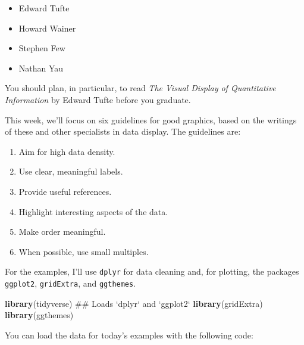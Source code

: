 \documentclass[]{book}
\makeatletter
\newenvironment{Shaded}{\begin{snugshade}}{\end{snugshade}}
\newcommand{\KeywordTok}[1]{\textcolor[rgb]{0.13,0.29,0.53}{\textbf{{#1}}}}
\newcommand{\DecValTok}[1]{\textcolor[rgb]{0.00,0.00,0.81}{{#1}}}
\newcommand{\StringTok}[1]{\textcolor[rgb]{0.31,0.60,0.02}{{#1}}}
\newcommand{\NormalTok}[1]{{#1}}
\providecommand{\tightlist}{%
  \setlength{\itemsep}{0pt}\setlength{\parskip}{0pt}}
\newenvironment{kframe}{%
\medskip{}
\setlength{\fboxsep}{.8em}
 \def\at@end@of@kframe{}%
 \ifinner\ifhmode%
  \def\at@end@of@kframe{\end{minipage}}%
  \begin{minipage}{\columnwidth}%
 \fi\fi%
 \def\FrameCommand##1{\hskip\@totalleftmargin \hskip-\fboxsep
 \colorbox{shadecolor}{##1}\hskip-\fboxsep
     \hskip-\linewidth \hskip-\@totalleftmargin \hskip\columnwidth}%
 \MakeFramed {\advance\hsize-\width
   \@totalleftmargin\z@ \linewidth\hsize
   \@setminipage}}%
 {\par\unskip\endMakeFramed%
 \at@end@of@kframe}
\renewenvironment{Shaded}{\begin{kframe}}{\end{kframe}}
\makeatother
\begin{document}
\begin{itemize}
\tightlist
\item
  Edward Tufte
\item
  Howard Wainer
\item
  Stephen Few
\item
  Nathan Yau
\end{itemize}

You should plan, in particular, to read \emph{The Visual Display of
Quantitative Information} by Edward Tufte before you graduate.

This week, we'll focus on six guidelines for good graphics, based on the
writings of these and other specialists in data display. The guidelines
are:

\begin{enumerate}
\def\labelenumi{\arabic{enumi}.}
\tightlist
\item
  Aim for high data density.
\item
  Use clear, meaningful labels.
\item
  Provide useful references.
\item
  Highlight interesting aspects of the data.
\item
  Make order meaningful.
\item
  When possible, use small multiples.
\end{enumerate}

For the examples, I'll use \texttt{dplyr} for data cleaning and, for
plotting, the packages \texttt{ggplot2}, \texttt{gridExtra}, and
\texttt{ggthemes}.

\begin{Shaded}
\begin{Highlighting}[]
\KeywordTok{library}\NormalTok{(tidyverse) ## Loads `dplyr` and `ggplot2`}
\KeywordTok{library}\NormalTok{(gridExtra)}
\KeywordTok{library}\NormalTok{(ggthemes)}
\end{Highlighting}
\end{Shaded}

You can load the data for today's examples with the following code:

\begin{Shaded}
\end{Shaded}
\end{document}
